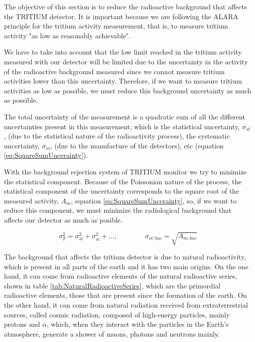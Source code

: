 The objective of this section is to reduce the radioactive background that affects the TRITIUM detector. It is important because we are following the ALARA principle for the tritium activity measurement, that is, to measure tritium activity "as low as reasonably achievable".

We have to take into account that the low limit reached in the tritium activity measured with our detector will be limited due to the uncertainty in the activity of the radioactive background measured since we cannot measure tritium activities lower than this uncertainty. Therefore, if we want to measure tritium activities as low as possible, we must reduce this background uncertainty as much as possible.

The total uncertainty of the measurement is a quadratic sum of all the different uncertainties present in this measurement, which is the statistical uncertainty, $\sigma_{st}$, (due to the statistical nature of the radioactivity process), the systematic uncertainty, $\sigma_{si}$, (due to the manufacture of the detectors), etc (equation \ref{eq:SquareSumUncerainty}).

With the background rejection system of TRITIUM monitor we try to minimize the statistical component. Because of the Poissonian nature of the process, the statistical component of the uncertainty corresponds to the square root of the measured activity, $A_{m}$, equation \ref{eq:SquareSumUncerainty}, so, if we want to reduce this component, we must minimize the radiological background that affects our detector as much as posible.

\begin{equation}
\sigma_{T}^2 = \sigma_{st}^2 +\sigma_{si}^2 + ... ; \qquad \qquad \sigma_{st;bac} = \sqrt{A_{m;bac}}
\label{eq:SquareSumUncerainty}
\end{equation} 

The background that affects the tritium detector is due to natural radioactivity, which is present in all parts of the earth and it has two main origins. On the one hand, it can come from radioactive elements of the natural radioactive series, shown in table \ref{tab:NaturalRadioactiveSeries}, which are the primordial radioactive elements, those that are present since the formation of the earth. On the other hand, it can come from natural radiation received from extraterrestrial sources, called cosmic radiation, composed of high-energy particles, mainly protons and $\alpha$, which, when they interact with the particles in the Earth's atmosphere, generate a shower of muons, photons and neutrons mainly.

